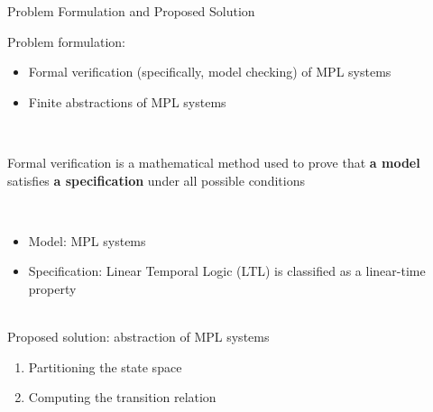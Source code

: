 \documentclass[aspectratio=169]{beamer} %
\begin{document}
	\begin{frame}{Problem Formulation and Proposed Solution}
		
		Problem formulation:
		\begin{itemize}
			\item Formal verification (specifically, model checking) of MPL systems
			
			\item Finite abstractions of MPL systems
		\end{itemize}
		
		\-\\
		
		\begin{block}{}
			Formal verification is a mathematical method used to prove that \textbf{a model} satisfies \textbf{a specification} under all possible conditions
		\end{block}
		
		\-\\
		
		\begin{itemize}
			\item Model: MPL systems
			\item Specification: Linear Temporal Logic (LTL) is classified as a linear-time property
		\end{itemize}
		
		\-\\
		
		Proposed solution: abstraction of MPL systems
		\begin{enumerate}
			\item Partitioning the state space
			\item Computing the transition relation
		\end{enumerate}
		
	\end{frame}
	
\end{document}
